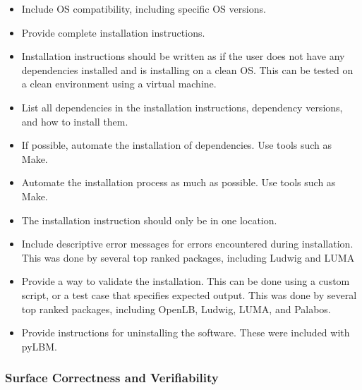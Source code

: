 \documentclass[12pt, notitlepage]{article}
\begin{document}
\begin{itemize}
	\item Include OS compatibility, including specific OS versions.
	\item Provide complete installation instructions.
	\item Installation instructions should be written as if the user does not have any dependencies installed and is installing on a clean OS. This can be tested on a clean environment using a virtual machine.
	\item List all dependencies in the installation instructions, dependency versions, and how to install them.
	\item If possible, automate the installation of dependencies. Use tools such as Make. 
	\item Automate the installation process as much as possible. Use tools such as Make.
	\item The installation instruction should only be in one location.
	\item Include descriptive error messages for errors encountered during installation. This was done by several top ranked packages, including Ludwig and LUMA
	\item Provide a way to validate the installation. This can be done using a custom script, or a test case that specifies expected output. This was done by several top ranked packages, including OpenLB, Ludwig, LUMA, and Palabos.
	\item Provide instructions for uninstalling the software. These were included with pyLBM.
\end{itemize}

\subsubsection{Surface Correctness and Verifiability}
\end{document}
